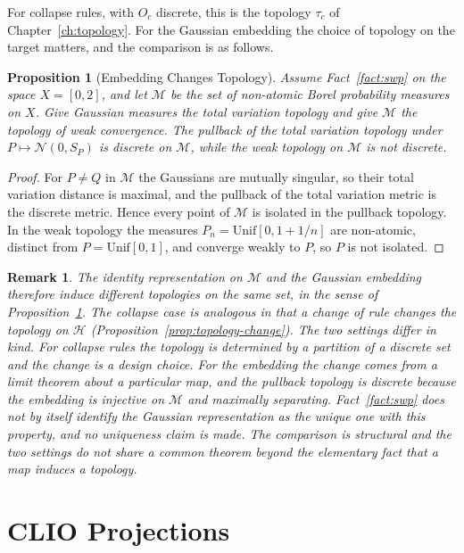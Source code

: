 \documentclass[12pt,oneside,openany]{book}
\theoremstyle{spherepop}
\newtheorem{proposition}[definition]{Proposition}
\theoremstyle{remarkstyle}
\newtheorem{remark}[definition]{Remark}
\newcommand{\calH}{\mathcal{H}}
\begin{document}
For collapse rules, with $O_c$ discrete, this is the topology $\tau_c$ of Chapter~\ref{ch:topology}. For the Gaussian embedding the choice of topology on the target matters, and the comparison is as follows.

\begin{proposition}[Embedding Changes Topology]
\label{thm:rep-topology}
Assume Fact~\ref{fact:swp} on the space $X=[0,2]$, and let $\mathcal M$ be the set of non-atomic Borel probability measures on $X$. Give Gaussian measures the total variation topology and give $\mathcal M$ the topology of weak convergence. The pullback of the total variation topology under $P\mapsto\mathcal N(0,S_P)$ is discrete on $\mathcal M$, while the weak topology on $\mathcal M$ is not discrete.
\end{proposition}

\begin{proof}
For $P\ne Q$ in $\mathcal M$ the Gaussians are mutually singular, so their total variation distance is maximal, and the pullback of the total variation metric is the discrete metric. Hence every point of $\mathcal M$ is isolated in the pullback topology. In the weak topology the measures $P_n=\mathrm{Unif}[0,1+1/n]$ are non-atomic, distinct from $P=\mathrm{Unif}[0,1]$, and converge weakly to $P$, so $P$ is not isolated.
\end{proof}

\begin{remark}
The identity representation on $\mathcal M$ and the Gaussian embedding therefore induce different topologies on the same set, in the sense of Proposition~\ref{thm:rep-topology}. The collapse case is analogous in that a change of rule changes the topology on $\calH$ (Proposition~\ref{prop:topology-change}). The two settings differ in kind. For collapse rules the topology is determined by a partition of a discrete set and the change is a design choice. For the embedding the change comes from a limit theorem about a particular map, and the pullback topology is discrete because the embedding is injective on $\mathcal M$ and maximally separating. Fact~\ref{fact:swp} does not by itself identify the Gaussian representation as the unique one with this property, and no uniqueness claim is made. The comparison is structural and the two settings do not share a common theorem beyond the elementary fact that a map induces a topology.
\end{remark}

\section{CLIO Projections}
\end{document}
